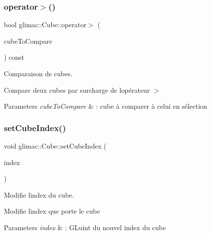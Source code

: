 \subsubsection{\texorpdfstring{operator$>$()}{operator>()}}
{\footnotesize\ttfamily bool glimac\+::\+Cube\+::operator$>$ (\begin{DoxyParamCaption}\item[{const \hyperlink{classglimac_1_1Cube}{Cube} \&}]{cube\+To\+Compare }\end{DoxyParamCaption}) const\hspace{0.3cm}{\ttfamily [inline]}}



Comparaison de cubes. 

Compare deux cubes par surcharge de l\textquotesingle{}opérateur $>$


\begin{DoxyParams}{Parameters}
{\em cube\+To\+Compare} & \+: cube à comparer à celui en sélection \\
\hline
\end{DoxyParams}
\mbox{\label{classglimac_1_1Cube_aa98b9f6d9554e658643eac25815b0b02}} 
\subsubsection{\texorpdfstring{set\+Cube\+Index()}{setCubeIndex()}}
{\footnotesize\ttfamily void glimac\+::\+Cube\+::set\+Cube\+Index (\begin{DoxyParamCaption}\item[{G\+Luint}]{index }\end{DoxyParamCaption})}



Modifie l\textquotesingle{}index du cube. 

Modifie l\textquotesingle{}index que porte le cube


\begin{DoxyParams}{Parameters}
{\em index} & \+: G\+Luint du nouvel index du cube \\
\hline
\end{DoxyParams}
\mbox{\label{classglimac_1_1Cube_af89fa188e904dd7db6ebccff5f4c3f4f}} 
